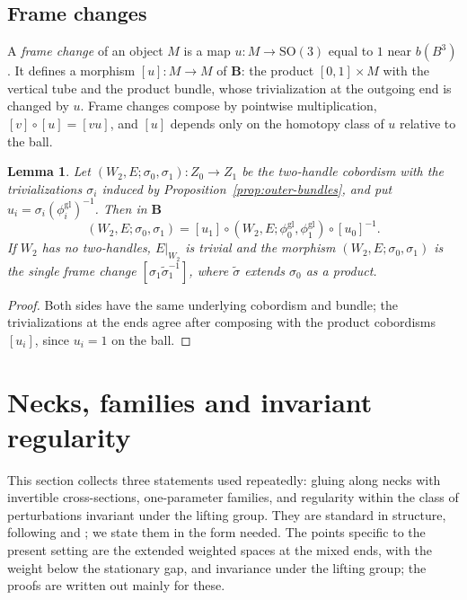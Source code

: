 \documentclass[11pt]{amsart}
\newtheorem{lemma}[theorem]{Lemma}
\theoremstyle{definition}
\theoremstyle{remark}
\theoremstyle{plain}
\numberwithin{equation}{section}
\newcommand{\bB}{\mathbf{B}}
\newcommand{\SO}{\mathrm{SO}}
\begin{document}
\subsection{Frame changes}\label{subsec:frame-change}

A \emph{frame change} of an object $M$ is a map $u\colon M\to\SO(3)$ equal to
$1$ near $b(B^3)$. It defines a morphism $[u]\colon M\to M$ of $\bB$: the
product $[0,1]\times M$ with the vertical tube and the product bundle, whose
trivialization at the outgoing end is changed by $u$. Frame changes compose
by pointwise multiplication, $[v]\circ[u]=[vu]$, and $[u]$ depends only on
the homotopy class of $u$ relative to the ball.

\begin{lemma}\label{lem:two-handle-frames}
Let $(W_2,E;\sigma_0,\sigma_1)\colon Z_0\to Z_1$ be the two-handle cobordism with
the trivializations $\sigma_i$ induced by Proposition~\ref{prop:outer-bundles},
and put $u_i=\sigma_i(\phi_i^{\mathrm{gl}})^{-1}$. Then in $\bB$
\begin{equation}\label{eq:W2-normal-form}
(W_2,E;\sigma_0,\sigma_1)=[u_1]\circ(W_2,E;\phi_0^{\mathrm{gl}},\phi_1^{\mathrm{gl}})
\circ[u_0]^{-1}.
\end{equation}
If $W_2$ has no two-handles, $E|_{W_2}$ is trivial and the morphism $(W_2,E;\sigma_0,\sigma_1)$ is the
single frame change $[\sigma_1\tilde\sigma_1^{-1}]$, where $\tilde\sigma$ extends
$\sigma_0$ as a product.
\end{lemma}

\begin{proof}
Both sides have the same underlying cobordism and bundle; the
trivializations at the ends agree after composing with the product
cobordisms $[u_i]$, since $u_i=1$ on the ball.
\end{proof}

\section{Necks, families and invariant regularity}\label{sec:families}

This section collects three statements used repeatedly: gluing along
necks with invertible cross-sections, one-parameter families, and
regularity within the class of perturbations invariant under the
lifting group. They are standard in structure, following
\cite[Sections~3--5]{Donaldson-book} and \cite[Section~4]{DFL}; we state them in the form
needed. The points specific to the present setting are the extended weighted spaces at the
mixed ends, with the weight below the stationary gap, and invariance under the lifting
group; the proofs are written out mainly for these.
\end{document}
